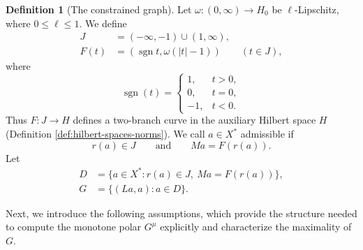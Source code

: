 \documentclass[11pt]{article}
\newcommand{\sgn}{\operatorname{sgn}}
\theoremstyle{definition}
\newtheorem{definition}{Definition}
\theoremstyle{remark}
\begin{document}
\begin{definition}[The constrained graph]
\label{def:construction-graph}
Let $\omega:(0,\infty)\to H_0$ be $\ell$-Lipschitz, where $0\le\ell\le1$. We define 
\[
\begin{aligned}
J&=(-\infty,-1)\cup(1,\infty),\\
F(t)&=(\sgn t,\omega(|t|-1))\qquad(t\in J), 
\end{aligned}
\]
where \[
\operatorname{sgn}(t)=
\begin{cases}
1, & t>0,\\
0, & t=0,\\
-1, & t<0.
\end{cases}
\] 
Thus $F:J\to H$ defines a two-branch curve in the auxiliary Hilbert
space $H$ (Definition \ref{def:hilbert-spaces-norms}). We call $a\in X^*$ admissible if
\[
r(a)\in J
\qquad\text{and}\qquad
Ma=F(r(a)).
\]
Let
\begin{equation}
\begin{aligned}
D&=\{a\in X^*:r(a)\in J,\ Ma=F(r(a))\},\\
G&=\{(La,a):a\in D\}.
\end{aligned}
\label{eq:abs-full-graph}
\end{equation}








\end{definition}




Next, we introduce the following assumptions, which provide the structure needed to compute the monotone polar $G^\mu$ explicitly and characterize the maximality of $G$. 
\end{document}
